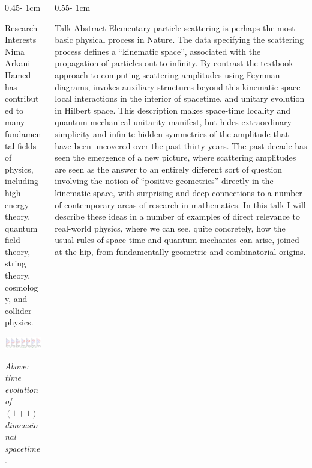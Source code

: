\documentclass{../psuposter}
\begin{document}
\begin{frame}
\begin{columns}
\begin{column}{0.45\textwidth - 1cm}
    \begin{block}{Research Interests}
        Nima Arkani-Hamed has contributed to many fundamental fields of physics, including high energy theory, quantum field theory, string theory, cosmology, and collider physics.
        \begin{center}
	    	\includegraphics[width=0.98\textwidth]{images/quiver-nolabel}    		
    	\end{center}
    	\textit{Above: time evolution of $(1+1)$-dimensional spacetime}. \cite{arkani-hamedCausalDiamondsCluster2020}
    \end{block}
\end{column}

\begin{column}{0.55\textwidth - 1cm}


    \begin{block}{Talk Abstract}
        Elementary particle scattering is perhaps the most basic physical process in Nature. The data specifying the scattering process defines a ``kinematic space'', associated with the propagation of particles out to infinity. By contrast the textbook approach to computing scattering amplitudes using Feynman diagrams, invokes auxiliary structures beyond this kinematic space--local interactions in the interior of spacetime, and unitary evolution in Hilbert space. This description makes space-time locality and quantum-mechanical unitarity manifest, but hides extraordinary simplicity and infinite hidden symmetries of the amplitude that have been uncovered over the past thirty years. The past decade has seen the emergence of a new picture, where scattering amplitudes are seen as the answer to an entirely different sort of question involving  the notion of ``positive geometries'' directly in the kinematic space, with surprising and deep connections to a number of contemporary areas of research in mathematics. In this talk I will describe these ideas in a number of examples of direct relevance to real-world physics, where we can see, quite concretely, how the usual rules of space-time and quantum mechanics can arise, joined at the hip, from fundamentally geometric and combinatorial origins.
    \end{block}



\end{column}
\end{columns}
\end{frame}
\end{document}
